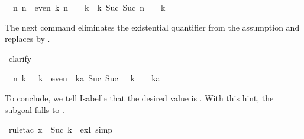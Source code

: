 \begin{isabellebody}
\begin{isamarkuptxt}%
\begin{isabelle}%
\ {}{}\ {}n{}\ {}n\ {}\ even{}\ {}k{}\ n\ {}\ {}\ {}\ k{}\ {}\ {}k{}\ Suc\ {}Suc\ n{}\ {}\ {}\ {}\ k%
\end{isabelle}
The next command eliminates the existential quantifier from the assumption
and replaces  by .%
\end{isamarkuptxt}%
\isamarkuptrue%
\isamarkupfalse%
\ clarify%
\begin{isamarkuptxt}%
\begin{isabelle}%
\ {}{}\ {}n\ k{}\ {}\ {}\ k\ {}\ even\ {}\ {}ka{}\ Suc\ {}Suc\ {}{}\ {}\ k{}{}\ {}\ {}\ {}\ ka%
\end{isabelle}
To conclude, we tell Isabelle that the desired value is
.  With this hint, the subgoal falls to .%
\end{isamarkuptxt}%
\isamarkuptrue%
\isamarkupfalse%
\ {}rule{}tac\ x\ {}\ {}Suc\ k{}\ \ exI{}\ simp{}%

\end{isabellebody}
